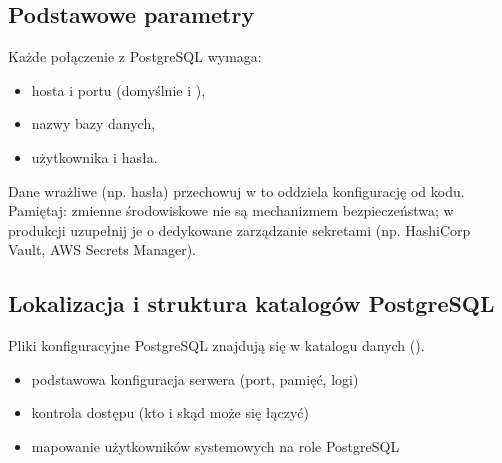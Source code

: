 \documentclass[a4paper,11pt,english,openany,oneside]{sphinxmanual}
\begin{document}
\subsection{Podstawowe parametry}
\label{\detokenize{rozdzial_2/rozdzial_22/index:podstawowe-parametry}}
\sphinxAtStartPar
Każde połączenie z PostgreSQL wymaga:
\begin{itemize}
\item {} 
\sphinxAtStartPar
hosta i portu (domyślnie  i ),

\item {} 
\sphinxAtStartPar
nazwy bazy danych,

\item {} 
\sphinxAtStartPar
użytkownika i hasła.

\end{itemize}

\sphinxAtStartPar
Dane wrażliwe (np. hasła) przechowuj w  \textendash{} to oddziela konfigurację od kodu.
Pamiętaj: zmienne środowiskowe nie są mechanizmem bezpieczeństwa; w produkcji uzupełnij je o dedykowane
zarządzanie sekretami (np. HashiCorp Vault, AWS Secrets Manager).


\subsection{Lokalizacja i struktura katalogów PostgreSQL}
\label{\detokenize{rozdzial_2/rozdzial_22/index:lokalizacja-i-struktura-katalogow-postgresql}}
\sphinxAtStartPar
Pliki konfiguracyjne PostgreSQL znajdują się w katalogu danych ().

\sphinxAtStartPar
{}
\begin{itemize}
\item {} 
\sphinxAtStartPar
{} \textendash{} podstawowa konfiguracja serwera (port, pamięć, logi)

\item {} 
\sphinxAtStartPar
{} \textendash{} kontrola dostępu (kto i skąd może się łączyć)

\item {} 
\sphinxAtStartPar
{} \textendash{} mapowanie użytkowników systemowych na role PostgreSQL

\end{itemize}
\end{document}
